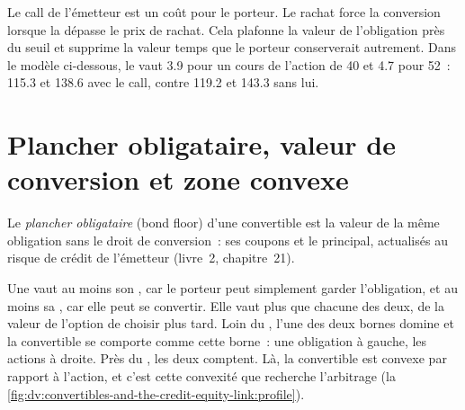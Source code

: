 Le call de l'émetteur est un coût pour le porteur. Le rachat force la conversion lorsque la  dépasse le prix de rachat. Cela plafonne la
valeur de l'obligation près du seuil et supprime la valeur temps que le porteur conserverait autrement. Dans le modèle ci-dessous, le  vaut
3.9 pour un cours de l'action de 40 et 4.7 pour 52~: 115.3 et 138.6 avec le call, contre 119.2 et 143.3 sans lui.

\section{Plancher obligataire, valeur de conversion et zone convexe}

\begin{definition}\label{def:dv:convertibles-and-the-credit-equity-link:floor}
Le \emph{plancher obligataire} (bond floor) d'une convertible est la valeur de la même obligation sans le droit de conversion~: ses coupons et
le principal, actualisés au risque de crédit de l'émetteur (livre~2, chapitre~21).
\end{definition}

Une  vaut au moins son , car le porteur peut simplement garder l'obligation, et au moins sa ,
car elle peut se convertir. Elle vaut plus que chacune des deux, de la valeur de l'option de choisir plus tard. Loin du , l'une
des deux bornes domine et la convertible se comporte comme cette borne~: une obligation à gauche, les actions à droite. Près du , les deux
comptent. Là, la convertible est convexe par rapport à l'action, et c'est cette convexité que recherche l'arbitrage
(la \cref{fig:dv:convertibles-and-the-credit-equity-link:profile}).

